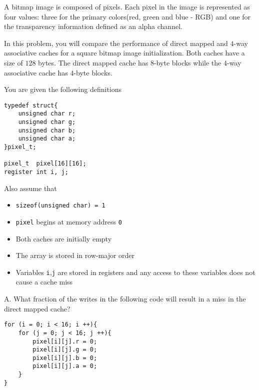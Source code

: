 \begin{problem}{8}

A bitmap image is composed of pixels. Each pixel in the image is
represented as four values: three for the primary colors(red, green
and blue - RGB) and one for the transparency information defined as an
alpha channel.

\vspace{0.15in}

In this problem, you will compare the performance of direct mapped and
$4$-way associative caches for a square bitmap image
initialization. Both caches have a size of $128$ bytes. The direct
mapped cache has $8$-byte blocks while the $4$-way associative cache
has $4$-byte blocks.

\vspace{0.15in}

You are given the following definitions

\begin{verbatim}
typedef struct{
    unsigned char r;
    unsigned char g;
    unsigned char b;
    unsigned char a;
}pixel_t;

pixel_t  pixel[16][16];
register int i, j;
\end{verbatim}

Also assume that
\begin{itemize}

\item \verb|sizeof(unsigned char) = 1|
\item \verb|pixel| begins at memory address \verb|0|
\item Both caches are initially empty
\item The array is stored in row-major order
\item Variables \verb|i|,\verb|j| are stored in registers and any access to these variables does not cause a cache miss

\end{itemize}

\end{problem}

A. What fraction of the writes in the following code will result in a miss in the direct mapped cache?

\begin{verbatim}
for (i = 0; i < 16; i ++){
    for (j = 0; j < 16; j ++){
        pixel[i][j].r = 0;
        pixel[i][j].g = 0;
        pixel[i][j].b = 0;
        pixel[i][j].a = 0;
    }
}
\end{verbatim}

